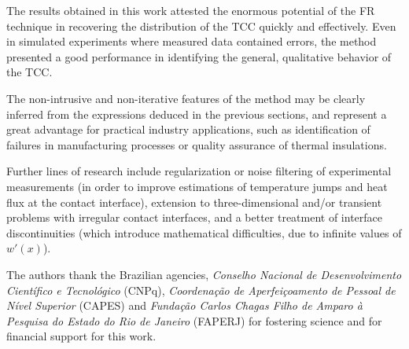 \documentclass[conference,compsoc,fleqn]{IEEEtran}
\begin{document}

The results obtained in this work attested the enormous potential of the FR technique in recovering the distribution of the TCC quickly and effectively. Even in simulated experiments where measured data contained errors, the method presented a good performance in identifying the general, qualitative behavior of the TCC.

The non-intrusive and non-iterative features of the method may be clearly inferred from the expressions deduced in the previous sections, and represent a great advantage for practical industry applications, such as identification of failures in manufacturing processes or quality assurance of thermal insulations.

Further lines of research include regularization or noise filtering of experimental measurements (in order to improve estimations of temperature jumps and heat flux at the contact interface), extension to three-dimensional and/or transient problems with irregular contact interfaces, and a better treatment of interface discontinuities (which introduce mathematical difficulties, due to infinite values of $w'(x)$).
\\


The authors thank the Brazilian agencies, \textit{Conselho Nacional de
	Desenvolvimento Científico e Tecnológico} (CNPq), \textit{Coordenação de
	Aperfeiçoamento de Pessoal de Nível Superior} (CAPES) and \textit{Fundação Carlos Chagas Filho de Amparo à Pesquisa do Estado do Rio de Janeiro}
(FAPERJ) for fostering
science and for financial support for this work.

\renewcommand{\refname}{\noindent{\fontfamily{phv}\selectfont\normalsize \textbf{REFERENCES}}} 



\end{document}
